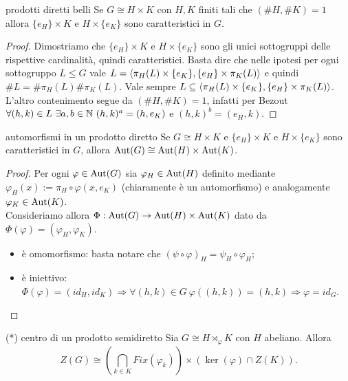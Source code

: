 \begin{proposition}{prodotti diretti belli}
    Se $G \cong H \times K$ con $H,K$ finiti tali che $(\#H, \#K) = 1$ allora $\{e_H\} \times K$ e $H \times \{e_K\}$ sono caratteristici in $G$.
\end{proposition}
\begin{proof}
    Dimostriamo che $\{e_H\} \times K$ e $H \times \{e_K\}$ sono gli unici sottogruppi delle rispettive cardinalità, quindi caratteristici. Basta dire che nelle ipotesi per ogni sottogruppo $L \le G$ vale $L = \langle \pi_H(L) \times \{e_K\}, \{e_H\} \times \pi_K(L) \rangle$ e quindi $\#L = \#\pi_H(L) \#\pi_K(L)$. Vale sempre $L \subseteq \langle \pi_H(L) \times \{e_K\}, \{e_H\} \times \pi_K(L) \rangle$. L'altro contenimento segue da $(\#H, \#K) = 1$, infatti per Bezout $\forall (h, k) \in L \ \exists a, b \in \N \ (h, k)^a = (h, e_K)$ e $(h, k)^b = (e_H, k)$.
\end{proof}
\begin{proposition}{automorfismi in un prodotto diretto}
    Se $G \cong H \times K$ e $\{e_H\} \times K$ e $H \times \{e_K\}$ sono caratteristici in $G$, allora $\text{Aut}(G) \cong \text{Aut}(H) \times \text{Aut}(K)$. 
\end{proposition}
\begin{proof}
    Per ogni $\varphi \in \text{Aut}(G)$ sia $\varphi_H \in \text{Aut}(H)$ definito mediante $\varphi_H(x) := \pi_H \circ \varphi (x, e_K)$ (chiaramente è un automorfismo) e analogamente $\varphi_K \in \text{Aut}(K)$. \\
    Consideriamo allora $\Phi: \text{Aut}(G) \rightarrow \text{Aut}(H) \times \text{Aut}(K)$ dato da $\Phi(\varphi) = (\varphi_H, \varphi_K)$. 
\begin{itemize}
    \item è omomorfismo: basta notare che $(\psi \circ \varphi)_H = \psi_H \circ \varphi_H$;
    \item è iniettivo: $\Phi(\varphi)=(id_H,id_K) \Rightarrow \forall (h, k) \in G \ \varphi((h, k)) = (h, k) \Rightarrow \varphi = id_G$.
\end{itemize}
\end{proof} 
\begin{proposition}{(*) centro di un prodotto semidiretto}
    Sia $G\cong H \rtimes_{\varphi} K$ con $H$ abeliano. Allora
    \[
    Z(G) \cong \left( \bigcap_{k \in K} Fix(\varphi_k) \right) \times (\ker(\varphi) \cap Z(K)).
    \]
\end{proposition}
